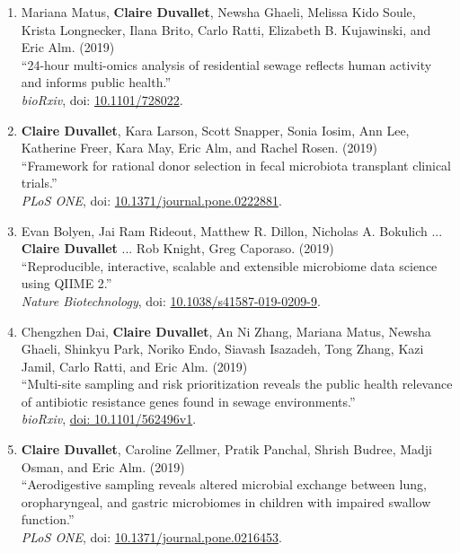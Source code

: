 \documentclass[10pt]{article}
\makeatletter
\newlength{\bibhang}
\newlength{\bibsep}
 {\@listi \global\bibsep\itemsep \global\advance\bibsep by\parsep}
\newenvironment{bibsection}%
        {\begin{enumerate}{}{%
       \setlength{\leftmargin}{\bibhang}%
       \setlength{\itemindent}{-\leftmargin}%
       \setlength{\itemsep}{\bibsep}%
       \setlength{\parsep}{\z@}%
        \setlength{\partopsep}{0pt}%
        \setlength{\topsep}{0pt}}}
        {\end{enumerate}\vspace{-.6\baselineskip}}
\makeatother
\begin{document}
\begin{bibsection}
	\item Mariana Matus, \textbf{Claire Duvallet}, Newsha Ghaeli, Melissa Kido Soule, Krista Longnecker, Ilana Brito, Carlo Ratti, Elizabeth B. Kujawinski, and Eric Alm. (2019) \\ 
		``24-hour multi-omics analysis of residential sewage reflects human activity and informs public health.''  \\ 
	\textit{bioRxiv}, doi: \href{https://doi.org/10.1101/728022}{10.1101/728022}.

		\item \textbf{Claire Duvallet}, Kara Larson, Scott Snapper, Sonia Iosim, Ann Lee, Katherine Freer, Kara May, Eric Alm, and Rachel Rosen. (2019) \\ 
		``Framework for rational donor selection in fecal microbiota transplant clinical trials.''  \\ 
		\textit{PLoS ONE}, doi: \href{https://doi.org/10.1371/journal.pone.0222881}{10.1371/journal.pone.0222881}.

		\item Evan Bolyen, Jai Ram Rideout, Matthew R. Dillon, Nicholas A. Bokulich ... \textbf{Claire Duvallet} ... Rob Knight, Greg Caporaso.   (2019) \\ 
		``Reproducible, interactive, scalable and extensible microbiome data science using QIIME 2.'' \\ 
		\textit{Nature Biotechnology}, doi: \href{https://doi.org/10.1038/s41587-019-0209-9}{10.1038/s41587-019-0209-9}.

	\item Chengzhen Dai, \textbf{Claire Duvallet}, An Ni Zhang, Mariana Matus, Newsha Ghaeli, Shinkyu Park, Noriko Endo, Siavash Isazadeh, Tong Zhang, Kazi Jamil, Carlo Ratti, and Eric Alm. (2019) \\
	``Multi-site sampling and risk prioritization reveals the public health relevance of antibiotic resistance genes found in sewage environments.''  \\
	\textit{bioRxiv},  \href{https://www.biorxiv.org/content/10.1101/562496v1}{doi: 10.1101/562496v1}.
					
	\item \textbf{Claire Duvallet}, Caroline Zellmer, Pratik Panchal, Shrish Budree, Madji Osman, and Eric Alm. (2019) \\ 
		``Aerodigestive sampling reveals altered microbial exchange between lung, oropharyngeal, and gastric microbiomes in children with impaired swallow function.'' \\ 
		\textit{PLoS ONE}, doi: \href{https://doi.org/10.1371/journal.pone.0216453}{10.1371/journal.pone.0216453}.
	

\end{bibsection}
\end{document}
